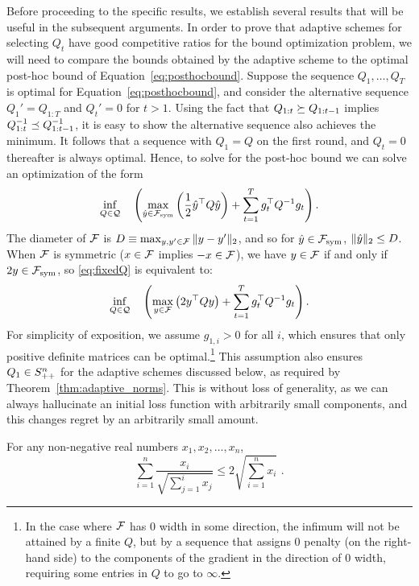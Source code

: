 Before proceeding to the specific results, we establish several
results that will be useful in the subsequent arguments.  In order to
prove that adaptive schemes for selecting $Q_t$ have good competitive
ratios for the bound optimization problem, we will need to compare the
bounds obtained by the adaptive scheme to the optimal post-hoc bound
of Equation~\eqref{eq:posthocbound}.  Suppose the sequence $Q_1,
\dots, Q_T$ is optimal for Equation~\eqref{eq:posthocbound}, and
consider the alternative sequence $Q_1' = Q_{1:T}$ and $Q_t' = 0$ for
$t > 1$.  Using the fact that $Q_{1:t}
\succeq Q_{1:t-1}$ implies $Q_{1:t}^{-1} \preceq Q_{1:t-1}^{-1}$, it is easy to
show the alternative sequence also achieves the minimum.
It follows that a sequence with $Q_1 = Q$ on the first round, and $Q_t
= 0$ thereafter is always optimal.  Hence, to solve for the post-hoc
bound we can solve an optimization of the form
\begin{equation}\label{eq:fixedQ}
 \inf_{Q \in \mathcal{Q}} \quad \left(\max_{\hat{y} \in \mathcal{F}_{\text{sym}}} \left( \frac{1}{2} \hat{y}^\top Q\hat{y} \right)
             + \sum_{t=1}^T g_t^\top Q^{-1}g_t\right).
\end{equation}
The diameter of $\mathcal{F}$ is $D \equiv \max_{y, y' \in \mathcal{F}} \| y -
y' \|_2$, and so for $\hat{y} \in \mathcal{F}_{\text{sym}}$, $\| \hat{y} \|_2 \leq D$.  
When $\mathcal{F}$ is symmetric ($x \in \mathcal{F}$ implies $-x \in \mathcal{F}$), we have $y
\in \mathcal{F}$ if and only if $2 y \in \mathcal{F}_{\text{sym}}$, so \eqref{eq:fixedQ} is
equivalent to:
\begin{equation}\label{eq:fixedQF}
 \inf_{Q \in \mathcal{Q}} \quad  \left(\max_{y \in \mathcal{F}} \left( 2 y^\top Qy \right)
             + \sum_{t=1}^T g_t^\top Q^{-1}g_t\right).
\end{equation}
For simplicity of exposition, we assume $g_{1, i} > 0$ for all $i$,
which ensures that only positive definite
matrices can be optimal.\footnote{In the case where $\mathcal{F}$ has 0 width
in some direction, the infimum will not be attained by a finite $Q$,
but by a sequence that assigns $0$ penalty (on the right-hand side) to
the components of the gradient in the direction of 0 width, requiring
some entries in $Q$ to go to $\infty$.}
This assumption also ensures $Q_1 \in S^n_{++}$ for the adaptive schemes
discussed below, as required by Theorem~\ref{thm:adaptive_norms}.
This is without loss of generality, as we can always hallucinate
an initial loss function with arbitrarily small components, and this changes
regret by an arbitrarily small amount.
\begin {lemma} \label {lem:sum}
For any non-negative real numbers $x_1, x_2, \ldots, x_n$,
\[
\sum_{i=1}^n \frac { x_i } { \sqrt { \sum_{j=1}^i x_j } }
  \le 2 \sqrt { \sum_{i=1}^n x_i } \mbox { .}
\]
\end {lemma}


